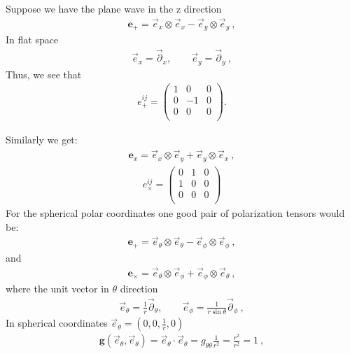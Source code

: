 \documentclass[11pt]{article}
\begin{document}
 \begin{example}
Suppose we have the plane wave in the z direction
  \begin{align}
 \boldsymbol{e}_+ = \vec{e}_x \otimes \vec{e}_x - \vec{e}_y \otimes \vec{e}_y \ , 
  \end{align}
  In flat space
    \begin{align}
  \vec{e}_x = \vec{\partial}_x ,  \qquad  \vec{e}_y = \vec{\partial}_y         \ , 
  \end{align}
  Thus, we see that
  \begin{align}
e^{ij}_+ =
  \begin{pmatrix}
                        1  &  0 & 0 \\
                        0  &  -1 & 0\\
                        0  &  0 & 0 \\
                        \end{pmatrix} .
  \end{align}
  
  Similarly we get:
    \begin{align}
 \boldsymbol{e}_x = \vec{e}_x \otimes \vec{e}_y + \vec{e}_y \otimes \vec{e}_x \ , 
  \end{align}
    \begin{align}
e^{ij}_\times =
  \begin{pmatrix}
                        0  &  1 & 0 \\
                        1  &  0 & 0\\
                        0  &  0 & 0 \\
                        \end{pmatrix} 
  \end{align}
  For the spherical polar coordinates one good pair of polarization tensors would be:
    \begin{align}
 \boldsymbol{e}_+ = \vec{e}_\theta \otimes \vec{e}_\theta - \vec{e}_\phi \otimes \vec{e}_\phi \ , 
  \end{align}
  and
      \begin{align}
 \boldsymbol{e}_\times = \vec{e}_\theta \otimes \vec{e}_\phi + \vec{e}_\phi \otimes \vec{e}_\theta \ , 
  \end{align}
  where the unit vector in $\theta$ direction
      \begin{align}
  \vec{e}_\theta = \frac{1}{r}\vec{\partial}_\theta ,  \qquad  \vec{e}_\phi = \frac{1}{r\sin\theta}\vec{\partial}_\phi         \ , 
  \end{align}
  In spherical coordinates $\vec{e}_\theta = (0,0,\frac{1}{r},0)$
        \begin{align}
  \boldsymbol{g}(\vec{e}_\theta,\vec{e}_\theta) =\vec{e}_\theta\cdot\vec{e}_\theta = g_{\theta\theta}\frac{1}{r^2}=\frac{r^2}{r^2} = 1          \ ,
  \end{align}
\end{example}
\end{document}
